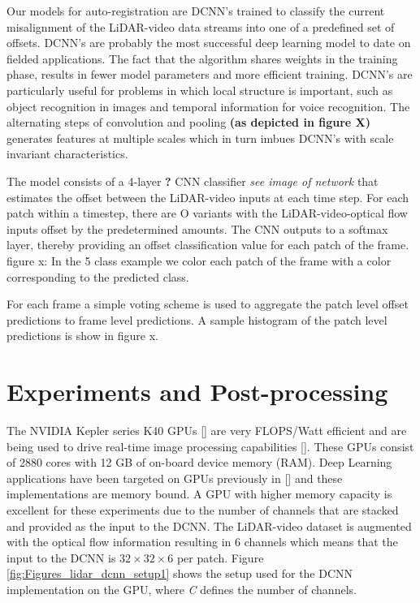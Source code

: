 \documentclass{article}
\begin{document}
Our models for auto-registration are DCNN's trained to classify the current misalignment of the LiDAR-video data streams into one of a predefined set of offsets. DCNN's are probably the most successful deep learning model to date on fielded applications. The fact that the algorithm shares weights in the training phase, results in fewer model parameters and more efficient training. DCNN's are particularly useful for problems in which local structure is important, such as object recognition in images and temporal information for voice recognition. The alternating steps of convolution and pooling \textbf{(as depicted in figure X)}  generates features at multiple scales which in turn imbues DCNN's with scale invariant characteristics.


The model consists of a 4-layer \textbf{?} CNN classifier \textit{see image of network} that estimates the offset between the LiDAR-video inputs at each time step. For each patch within a timestep, there are O variants with the LiDAR-video-optical flow inputs offset by the predetermined amounts. The CNN outputs to a softmax layer, thereby providing an offset classification value for each patch of the frame. 
figure x: In the 5 class example we color each patch of the frame with a color corresponding to the predicted class. 

For each frame a simple voting scheme is used to aggregate the patch level offset predictions to frame level predictions. A sample histogram of the patch level predictions is show in figure x.




\section{Experiments and Post-processing} %
\label{sec:experiments_and_post_processing}

The NVIDIA Kepler series K40 GPUs [\cite{NVIDIA-Inc.2012NVIDIAs-Ne}] are very FLOPS/Watt efficient and are being used to drive real-time image processing capabilities [\cite{Venugopal2013Accelerati}]. These GPUs consist of 2880 cores with 12 GB of on-board device memory (RAM). Deep Learning applications have been targeted on GPUs previously in [\cite{Krizhevsky2012Imagenet-C}] and these implementations are memory bound. A GPU with higher memory capacity is excellent for these experiments due to the number of channels that are stacked and provided as the input to the DCNN. The LiDAR-video dataset is augmented with the optical flow information resulting in 6 channels which means that the input to the DCNN is $32\times32\times6$ per patch. Figure \ref{fig:Figures_lidar_dcnn_setup1} shows the setup used for the DCNN implementation on the GPU, where \emph{C} defines the number of channels.
\end{document}
